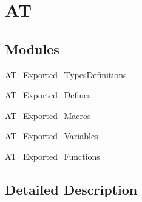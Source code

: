 \hypertarget{group___a_t}{}\section{AT}
\label{group___a_t}
\subsection*{Modules}
\begin{DoxyCompactItemize}
\item 
\mbox{\hyperlink{group___a_t___exported___types_definitions}{A\+T\+\_\+\+Exported\+\_\+\+Types\+Definitions}}
\item 
\mbox{\hyperlink{group___a_t___exported___defines}{A\+T\+\_\+\+Exported\+\_\+\+Defines}}
\item 
\mbox{\hyperlink{group___a_t___exported___macros}{A\+T\+\_\+\+Exported\+\_\+\+Macros}}
\item 
\mbox{\hyperlink{group___a_t___exported___variables}{A\+T\+\_\+\+Exported\+\_\+\+Variables}}
\item 
\mbox{\hyperlink{group___a_t___exported___functions}{A\+T\+\_\+\+Exported\+\_\+\+Functions}}
\end{DoxyCompactItemize}


\subsection{Detailed Description}
